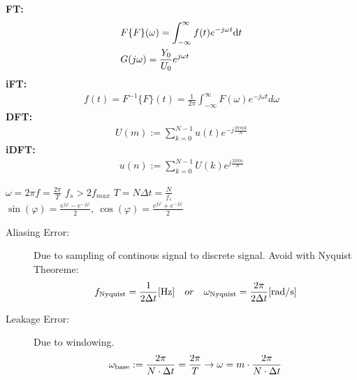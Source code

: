 \begin{tcolorbox}[colback=brown!5!white,colframe=brown!75!black,title=\textbf{Fourier Transformation}]
	\textbf{FT:}\begin{align*}
				  &F\{F\}(\omega) = \int_{-\infty}^{\infty} f(t) e^{-j\omega t}\mathrm{d} t\\
				  &G(j\omega)=\frac{Y_0}{U_0}e^{j\omega t}
	\end{align*}
	\textbf{iFT:}\begin{align*}
	f(t) = F^{-1}\{F\}(t) = \frac{1}{2\pi}\int_{-\infty}^{\infty} F(\omega) e^{-j\omega t}d\omega
	\end{align*}
	\textbf{DFT:}\begin{align*}
	U(m) := \sum_{k = 0}^{N-1} u(t)e^{-j\frac{2\pi m k}{N}}
	\end{align*}
	\textbf{iDFT:}\begin{align*}
	u(n) := \sum_{k = 0}^{N-1} U(k)e^{j\frac{2\pi k n}{N}}
				  \end{align*}
\end{tcolorbox}

\begin{tcolorbox}[colback=brown!5!white,colframe=brown!75!black,title=\textbf{Useful frequency things}]
  $\omega = 2\pi f = \frac{2\pi}{T}$ \quad $f_s > 2 f_{max}$ \quad $T = N \Delta{t} = \frac{N}{f_s} $\quad\\
  $\sin(\varphi)=\frac{e^{j\varphi}-e^{-j\varphi}}{2},\ \cos(\varphi)=\frac{e^{j\varphi}+e^{-j\varphi}}{2}$
\end{tcolorbox}

\begin{tcolorbox}[colback=brown!5!white,colframe=brown!75!black,title=\textbf{Aliasing and Leakage Errors}]
\begin{description}
	\item[Aliasing Error:] Due to sampling of continous signal to discrete signal. Avoid with Nyquist Theoreme:
	\begin{equation*}
	f_\mathrm{Nyquist} = \frac{1}{2\Delta t} [\SI{}{\hertz}] \quad or \quad \omega_\mathrm{Nyquist} = \frac{2\pi}{2\Delta t} [\SI{}{\radian \per \second}]
	\end{equation*}
	
	\item[Leakage Error:] Due to windowing.
	\begin{equation*}
	\omega_\mathrm{base} := \frac{2\pi}{N \cdot \Delta t} = \frac{2\pi}{T} \rightarrow \omega = m\cdot \frac{2\pi }{N \cdot \Delta t}
	\end{equation*}
\end{description}
\end{tcolorbox}

